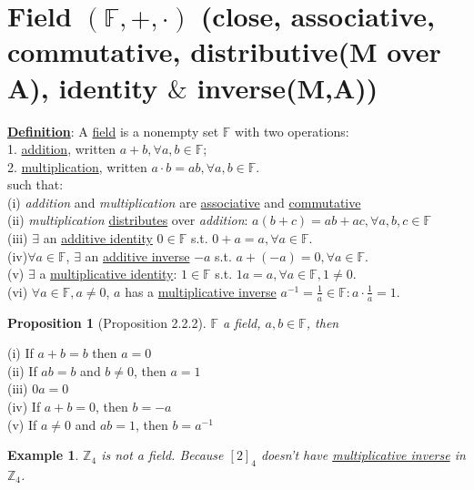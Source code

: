 \documentclass[11pt,a4paper]{article}
\newtheorem{proposition}{Proposition}
\newtheorem{example}{Example}
\begin{document}
\section{Field $(\mathbb{F}, +, \cdot)$ (close, associative, commutative, distributive(M over A), identity $\&$ inverse(M,A))}
\textbf{\underline{Definition}}: A \underline{field} is a nonempty set $\mathbb{F}$ with two operations:\\
1. \underline{addition}, written $a+b, \forall a,b\in\mathbb{F}$; \\
2. \underline{multiplication}, written $a\cdot b=ab, \forall a,b\in\mathbb{F}$.\\
such that:\\
(i) \textit{addition} and \textit{multiplication} are \underline{associative} and \underline{commutative}\\
(ii) \textit{multiplication} \underline{distributes} over \textit{addition}: $a(b+c)=ab+ac, \forall a,b,c\in\mathbb{F}$\\
(iii) $\exists$ an \underline{additive identity} $0\in \mathbb{F}$ s.t. $0+a=a, \forall a\in \mathbb{F}$.\\
(iv)$\forall a\in\mathbb{F}$, $\exists$ an \underline{additive inverse} $-a$ s.t. $a+(-a)=0, \forall a\in\mathbb{F}$.\\
(v) $\exists$ a \underline{multiplicative identity}: $1\in\mathbb{F}$ s.t. $1a=a, \forall a\in\mathbb{F}, 1\neq 0$.\\
(vi) $\forall a\in\mathbb{F}, a\neq 0$, $a$ has a \underline{multiplicative inverse} $a^{-1}=\frac{1}{a}\in\mathbb{F}: a\cdot\frac{1}{a}=1$.
\begin{proposition}[Proposition 2.2.2]
$\mathbb{F}$ a field, $a,b\in\mathbb{F}$, then
\end{proposition}
(i) If $a + b = b$ then $a = 0$\\
(ii) If $ab = b$ and $b \neq 0$, then $a = 1$\\
(iii) $0a = 0$\\
(iv) If $ a + b = 0$, then $b = -a$\\
(v) If $a \neq 0$ and $ab = 1$, then $b = a^{-1}$\\
\begin{example}
$\mathbb{Z}_4$ is not a field. Because $[2]_4$ doesn't have \underline{multiplicative inverse} in $\mathbb{Z}_4$.
\end{example}
\end{document}
